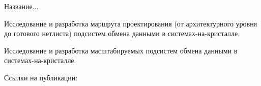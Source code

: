 \documentclass[a4paper,12pt]{report}
\begin{document}




Название...

Исследование и разработка маршрута проектирования (от архитектурного уровня до готового нетлиста) подсистем обмена данными в системах-на-кристалле.

Исследование и разработка масштабируемых подсистем обмена данными в системах-на-кристалле.

Ссылки на публикации:
 
\cite{MED01}
\cite{PYT01}
\cite{MED02}
\cite{MED03}
\cite{PYT02}
\cite{MED04}
\cite{PYT03}
\cite{MED05}
\cite{MED06}



\end{document}
